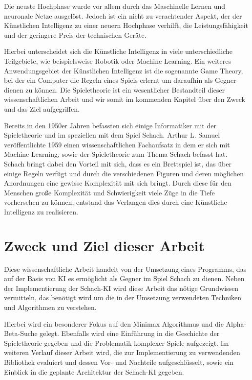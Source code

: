 
Die neuste Hochphase wurde vor allem durch das Maschinelle Lernen und neuronale Netze ausgelöst. Jedoch ist ein nicht zu verachtender Aspekt, der der Künstlichen Intelligenz zu einer neuern Hochphase verhilft, die Leistungsfähigkeit und der geringere Preis der technischen Geräte. 

Hierbei unterscheidet sich die Künstliche Intelligenz in viele unterschiedliche Teilgebiete, wie beispielsweise Robotik oder Machine Learning. Ein weiteres Anwendungsgebiet der Künstlichen Intelligenz ist die sogenannte Game Theory, bei der ein Computer die Regeln eines Spiels erlernt um daraufhin als Gegner dienen zu können. Die Spieletheorie ist ein wesentlicher Bestandteil dieser wissenschaftlichen Arbeit und wir somit im kommenden Kapitel über den Zweck und das Ziel aufgegriffen.

Bereits in den 1950er Jahren befassten sich einige Informatiker mit der Spieletheorie und im speziellen mit dem Spiel Schach. Arthur L. Samuel veröffentlichte 1959 einen wissenschaftlichen Fachaufsatz in dem er sich mit Machine Learning, sowie der Spieletheorie zum Thema Schach befasst hat.\cite{Samuel1959} Schach bringt dabei den Vorteil mit sich, dass es ein Brettspiel ist, das über einige Regeln verfügt und durch die verschiedenen Figuren und deren möglichen Anordnungen eine gewisse Komplexität mit sich bringt. Durch diese für den Menschen große Komplexität und Schwierigkeit viele Züge in die Tiefe vorhersehen zu können, entstand das Verlangen dies durch eine Künstliche Intelligenz zu realisieren.

\section{Zweck und Ziel dieser Arbeit}\label{zweck_und_ziel}
Diese wissenschaftliche Arbeit handelt von der Umsetzung eines Programms, das auf der Basis von KI es ermöglicht als Gegner im Spiel Schach zu dienen. Neben der Implementierung der Schach-KI wird diese Arbeit das nötige Grundwissen vermitteln, das benötigt wird um die in der Umsetzung verwendeten Techniken und Algorithmen zu verstehen. 

Hierbei wird ein besonderer Fokus auf den Minimax Algorithmus und die Alpha-Beta-Suche gelegt. Ebenfalls wird eine Einführung in die Geschichte der Spieletheorie gegeben und die Problematik komplexer Spiele aufgezeigt. Im weiteren Verlauf dieser Arbeit wird, die zur Implementierung zu verwendenden Bibliothek evaluiert und dessen Vor- und Nachteile aufgeschlüsselt, sowie ein Einblick in die geplante Architektur der Schach-KI gegeben.

